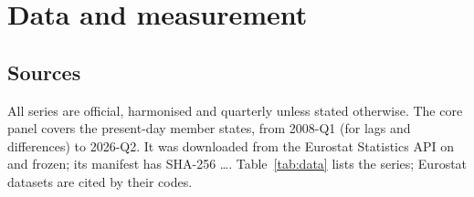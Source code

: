 \section{Data and measurement}\label{sec:data}

\subsection{Sources}

All series are official, harmonised and quarterly unless stated otherwise. The core panel
covers the present-day  member states, from 2008-Q1 (for lags and
differences) to 2026-Q2. It was downloaded from the Eurostat Statistics API on
 and frozen; its manifest has SHA-256 \dots.
Table~\ref{tab:data} lists the series; Eurostat datasets are cited by their codes.

